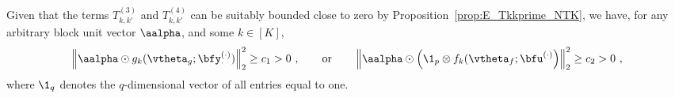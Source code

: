 \begin{prop}\label{prop:NTKPosDef_DeepONet}
    Given that the terms $T^{(3)}_{k,k'}$ and $T^{(4)}_{k,k'}$ can be suitably bounded close to zero by Proposition~\ref{prop:E_Tkkprime_NTK}, we have, for any arbitrary block unit vector $\aalpha$, and some $k \in [K]$,
    \begin{align}
        \left\| \aalpha \odot g_k(\vtheta_g; \bfy^{(\cdot)}_{\cdot}) \right\|_2^2 \geq c_1 > 0~, \qquad \text{or} \qquad \left\| \aalpha \odot \left(\1_p \otimes f_k(\vtheta_f; \bfu^{(\cdot)} \right) \right\|_2^2 \geq c_2 > 0~,
    \end{align}
where $\1_q$ denotes the $q$-dimensional vector of all entries equal to one.
\end{prop}
